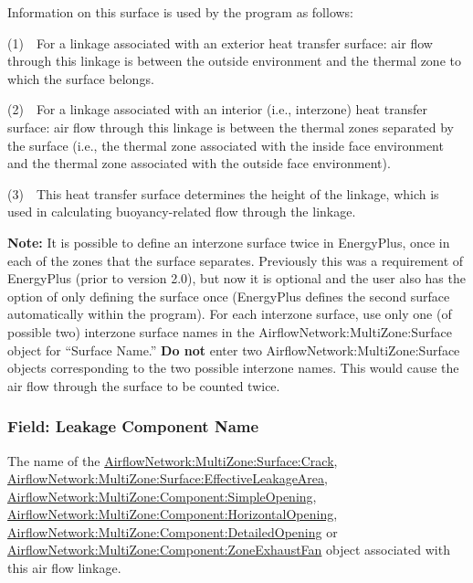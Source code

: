 Information on this surface is used by the program as follows:

(1)~~For a linkage associated with an exterior heat transfer surface: air flow through this linkage is between the outside environment and the thermal zone to which the surface belongs.

(2)~~For a linkage associated with an interior (i.e., interzone) heat transfer surface: air flow through this linkage is between the thermal zones separated by the surface (i.e., the thermal zone associated with the inside face environment and the thermal zone associated with the outside face environment).

(3)~~This heat transfer surface determines the height of the linkage, which is used in calculating buoyancy-related flow through the linkage.

\textbf{Note:} It is possible to define an interzone surface twice in EnergyPlus, once in each of the zones that the surface separates. Previously this was a requirement of EnergyPlus (prior to version 2.0), but now it is optional and the user also has the option of only defining the surface once (EnergyPlus defines the second surface automatically within the program). For each interzone surface, use only one (of possible two) interzone surface names in the AirflowNetwork:MultiZone:Surface object for ``Surface Name.'' \textbf{Do not} enter two AirflowNetwork:MultiZone:Surface objects corresponding to the two possible interzone names. This would cause the air flow through the surface to be counted twice.

\subsubsection{Field: Leakage Component Name}\label{field-leakage-component-name}

The name of the \hyperref[airflownetworkmultizonesurfacecrack]{AirflowNetwork:MultiZone:Surface:Crack}, \hyperref[airflownetworkmultizonesurfaceeffectiveleakagearea]{AirflowNetwork:MultiZone:Surface:EffectiveLeakageArea}, \hyperref[airflownetworkmultizonecomponentsimpleopening]{AirflowNetwork:MultiZone:Component:SimpleOpening}, \hyperref[airflownetworkmultizonecomponenthorizontalopening]{AirflowNetwork:MultiZone:Component:HorizontalOpening}, \hyperref[airflownetworkmultizonecomponentdetailedopening]{AirflowNetwork:MultiZone:Component:DetailedOpening} or \hyperref[airflownetworkmultizonecomponentzoneexhaustfan]{AirflowNetwork:MultiZone:Component:ZoneExhaustFan} object associated with this air flow linkage.

